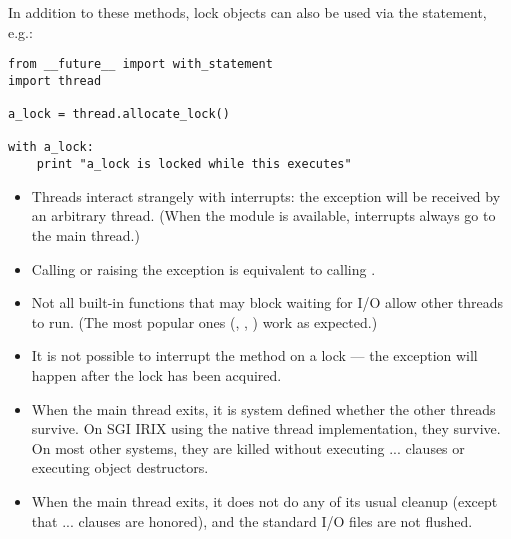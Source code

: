 In addition to these methods, lock objects can also be used via the
 statement, e.g.:

\begin{verbatim}
from __future__ import with_statement
import thread

a_lock = thread.allocate_lock()

with a_lock:
    print "a_lock is locked while this executes"
\end{verbatim}


\begin{itemize}
\item
Threads interact strangely with interrupts: the
 exception will be received by an
arbitrary thread.  (When the 
module is available, interrupts always go to the main thread.)

\item
Calling  or raising the 
exception is equivalent to calling .

\item
Not all built-in functions that may block waiting for I/O allow other
threads to run.  (The most popular ones (,
, ) work as
expected.)

\item
It is not possible to interrupt the  method on a lock
--- the  exception will happen after the
lock has been acquired.

\item
When the main thread exits, it is system defined whether the other
threads survive.  On SGI IRIX using the native thread implementation,
they survive.  On most other systems, they are killed without
executing  ...  clauses or executing
object destructors.

\item
When the main thread exits, it does not do any of its usual cleanup
(except that  ...  clauses are honored),
and the standard I/O files are not flushed.

\end{itemize}
